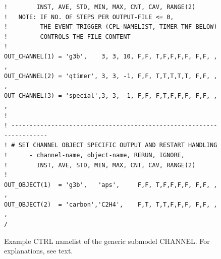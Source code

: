 \documentclass[twoside]{article}
\begin{document}
{\begin{figure}[h!]
\begin{center}
\begin{minipage}{0.6\textwidth}
\begin{verbatim}
!        INST, AVE, STD, MIN, MAX, CNT, CAV, RANGE(2)
!   NOTE: IF NO. OF STEPS PER OUTPUT-FILE <= 0,
!         THE EVENT TRIGGER (CPL-NAMELIST, TIMER_TNF BELOW)
!         CONTROLS THE FILE CONTENT
!
OUT_CHANNEL(1) = 'g3b',    3, 3, 10, F,F, T,F,F,F,F, F,F, , ,
OUT_CHANNEL(2) = 'qtimer', 3, 3, -1, F,F, T,T,T,T,T, F,F, , ,
OUT_CHANNEL(3) = 'special',3, 3, -1, F,F, F,T,F,F,F, F,F, , ,
!
! ---------------------------------------------------------------------
! # SET CHANNEL OBJECT SPECIFIC OUTPUT AND RESTART HANDLING
!      - channel-name, object-name, RERUN, IGNORE,
!        INST, AVE, STD, MIN, MAX, CNT, CAV, RANGE(2)
!
OUT_OBJECT(1)  = 'g3b',   'aps',     F,F, T,F,F,F,F, F,F, , ,
OUT_OBJECT(2)  = 'carbon','C2H4',    F,T, T,T,F,F,F, F,F, , ,
/
\end{verbatim}
\end{minipage}
\end{center}
\caption{Example CTRL namelist of the generic submodel CHANNEL.
For explanations, see text.}
 \label{fig:channel_ctrl}
\end{figure}
%

}
\end{document}
